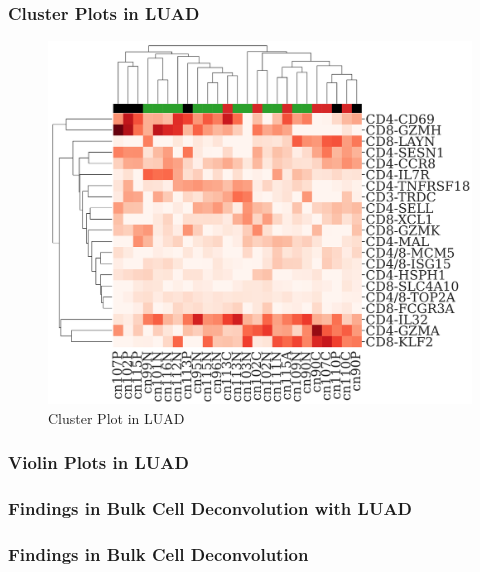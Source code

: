 \documentclass{beamer}
\begin{document}
    \begin{frame}
        \frametitle{Cluster Plots in LUAD}

        \begin{figure}
            \includegraphics[height=0.6 \textheight]{figures/BisqueRNA/clustermap/STAR.ADC.GSE162498.cluster.pdf}
            \caption{Cluster Plot in LUAD}
        \end{figure}
    \end{frame}

    \begin{frame}[allowframebreaks]
        \frametitle{Violin Plots in LUAD}
    \end{frame}

    \begin{frame}[allowframebreaks]
        \frametitle{Findings in Bulk Cell Deconvolution with LUAD}
    \end{frame}

    \begin{frame}
        \frametitle{Findings in Bulk Cell Deconvolution}
    \end{frame}
\end{document}
